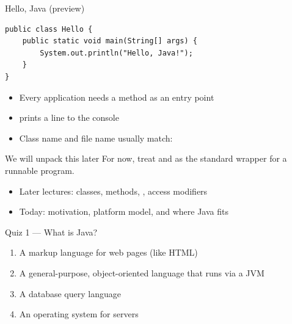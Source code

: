 \documentclass[aspectratio=169,11pt]{beamer}
\begin{document}
    \begin{frame}[fragile]{Hello, Java (preview)}
        \begin{lstlisting}
public class Hello {
    public static void main(String[] args) {
        System.out.println("Hello, Java!");
    }
}
        \end{lstlisting}
        \vspace{0.4em}
        \begin{itemize}
            \item Every application needs a  method as an entry point
            \item {} prints a line to the console
            \item Class name and file name usually match: 
        \end{itemize}
    \end{frame}

    \begin{frame}{We will unpack this later}
        For now, treat  and 
        as the standard wrapper for a runnable program.
        \vspace{0.8em}
        \begin{itemize}
            \item Later lectures: classes, methods, , access modifiers
            \item Today: motivation, platform model, and where Java fits
        \end{itemize}
        \vspace{0.6em}
    \end{frame}

    \begin{frame}{Quiz 1 --- What is Java?}
        \begin{enumerate}
            \item A markup language for web pages (like HTML)
            \item A general-purpose, object-oriented language that runs via a JVM
            \item A database query language
            \item An operating system for servers
        \end{enumerate}
        \quizpause
    \end{frame}
\end{document}
